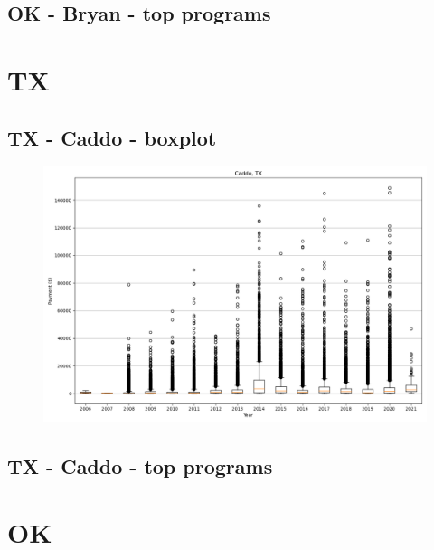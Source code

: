 \subsection*{OK - Bryan - top programs}

\newpage
\section*{TX}
\subsection*{TX - Caddo - boxplot}
\begin{figure}[h]
\centering
\includegraphics[width=7in]{../output/boxplots/counties/Caddo-TX_boxplot.png}
\end{figure}


\subsection*{TX - Caddo - top programs}

\newpage
\section*{OK}
